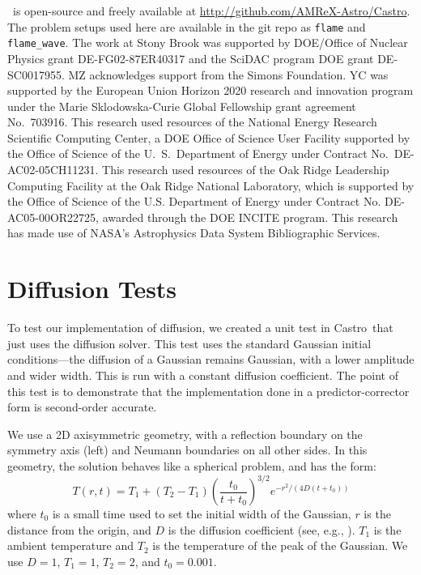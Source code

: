 \documentclass[trackchanges,preprint,times,tighten]{aastex63}
\newcommand{\castro}{{\sf Castro}}
\begin{document}
\acknowledgements \castro\ is open-source and freely available at
\url{http://github.com/AMReX-Astro/Castro}.  The problem setups used
here are available in the git repo as {\tt flame} and {\tt
  flame\_wave}.  The work at Stony Brook was supported by DOE/Office
of Nuclear Physics grant DE-FG02-87ER40317 and the SciDAC program DOE grant DE-SC0017955.  MZ acknowledges support
from the Simons Foundation.  YC was supported by the
European Union Horizon 2020 research and innovation program under
the Marie Sklodowska-Curie Global Fellowship grant agreement No.\
703916.  This research used resources of the National Energy Research
Scientific Computing Center, a DOE Office of Science User Facility
supported by the Office of Science of the U.~S.\ Department of Energy
under Contract No.\ DE-AC02-05CH11231.  This research used resources
of the Oak Ridge Leadership Computing Facility at the Oak Ridge
National Laboratory, which is supported by the Office of Science of
the U.S. Department of Energy under Contract No. DE-AC05-00OR22725,
awarded through the DOE INCITE program.  This research has made use of
NASA's Astrophysics Data System Bibliographic Services.






\appendix

\section{Diffusion Tests}
\label{app:diffusion}

To test our implementation of diffusion, we created a unit test in
\castro\ that just uses the diffusion solver.  This test uses the
standard Gaussian initial conditions---the diffusion of a Gaussian
remains Gaussian, with a lower amplitude and wider width.  This is run
with a constant diffusion coefficient. The point of this test is to
demonstrate that the implementation done in a predictor-corrector
form is second-order accurate.

We use a 2D axisymmetric geometry, with a reflection boundary on the symmetry axis (left)
and Neumann boundaries on all other sides.  In this geometry, the solution behaves like
a spherical problem, and has the form:
\begin{equation}
  T(r,t) = T_1 + (T_2 - T_1) \left (\frac{t_0}{t + t_0} \right )^{3/2} e^{-r^2/(4 D (t + t_0))}
\end{equation}
where $t_0$ is a small time used to set the initial width of the
Gaussian, $r$ is the distance from the origin, and $D$ is the
diffusion coefficient (see, e.g., \citet{SWE_MYRA09}).  $T_1$ is the ambient temperature and $T_2$ is
the temperature of the peak of the Gaussian.  We use $D = 1$, $T_1 = 1$, $T_2 = 2$,
and $t_0 = 0.001$.
\end{document}
